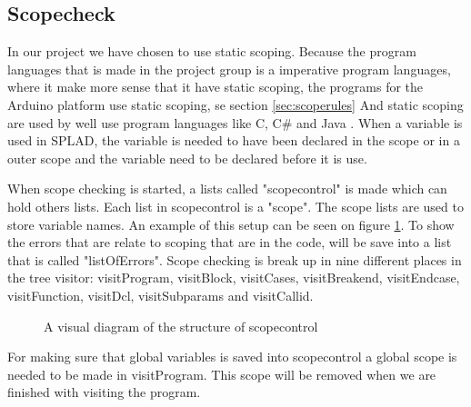 \subsection{Scopecheck}
\label{sec:scopecheck}
In our project we have chosen to use static scoping. Because the program languages that is made in the project group is a imperative program languages, where it make more sense that it have static scoping, the programs for the Arduino platform use static scoping, se section \ref{sec:scoperules}
And static scoping are used by well use program languages like C, C\# and Java \citep{ProgrammingCommunityIndex}.
When a variable is used in SPLAD, the variable is needed to have been declared in the scope or in a outer scope and the variable need to be declared before it is use.

When scope checking is started, a lists called "scopecontrol" is made which can hold others lists. Each list in scopecontrol is a "scope". The scope lists are used to store variable names. An example of this setup can be seen on figure \ref{fig:scopediagram}. To show the errors that are relate to scoping that are in the code, will be save into a list that is called "listOfErrors". Scope checking is break up in nine different places in the tree visitor: visitProgram, visitBlock, visitCases, visitBreakend, visitEndcase, visitFunction, visitDcl, visitSubparams and visitCallid.

\begin{figure}[H]

\centering
{}
\caption{A visual diagram of the structure of scopecontrol}
\label{fig:scopediagram}
\end{figure}

For making sure that global variables is saved into scopecontrol a global scope is needed to be made in visitProgram. This scope will be removed when we are finished with visiting the program.

